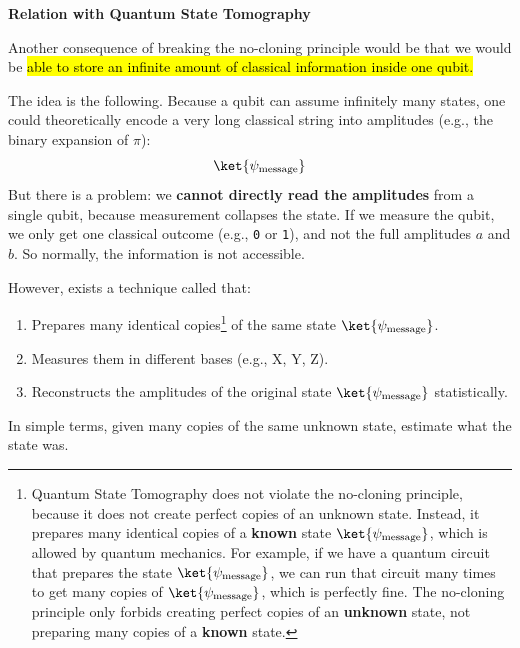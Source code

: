 \highspace
\begin{flushleft}
    \textcolor{Red2}{ \textbf{Relation with Quantum State Tomography}}
\end{flushleft}
Another consequence of breaking the no-cloning principle would be that we would be \hl{able to store an infinite amount of classical information inside one qubit.}

\highspace
The idea is the following. Because a qubit can assume infinitely many states, one could theoretically encode a very long classical string into amplitudes (e.g., the binary expansion of $\pi$):
\begin{equation*}
    \ket{\psi_{\text{message}}}
\end{equation*}
But there is a problem: we \textbf{cannot directly read the amplitudes} from a single qubit, because measurement collapses the state. If we measure the qubit, we only get one classical outcome (e.g., \texttt{0} or \texttt{1}), and not the full amplitudes $a$ and $b$. So normally, the information is not accessible.

\highspace
However, exists a technique called  that:
\begin{enumerate}
    \item Prepares many identical copies\footnote{
        Quantum State Tomography does not violate the no-cloning principle, because it does not create perfect copies of an unknown state. Instead, it prepares many identical copies of a \textbf{known} state $\ket{\psi_{\text{message}}}$, which is allowed by quantum mechanics. For example, if we have a quantum circuit that prepares the state $\ket{\psi_{\text{message}}}$, we can run that circuit many times to get many copies of $\ket{\psi_{\text{message}}}$, which is perfectly fine. The no-cloning principle only forbids creating perfect copies of an \textbf{unknown} state, not preparing many copies of a \textbf{known} state.
    } of the same state $\ket{\psi_{\text{message}}}$.
    \item Measures them in different bases (e.g., X, Y, Z).
    \item Reconstructs the amplitudes of the original state $\ket{\psi_{\text{message}}}$ statistically.
\end{enumerate}
In simple terms, given many copies of the same unknown state, estimate what the state was.


